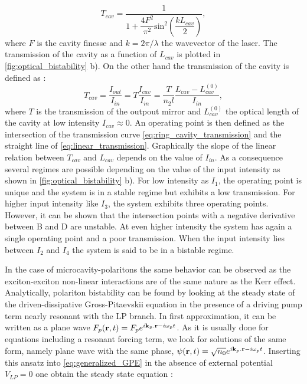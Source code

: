 \begin{equation}
    T_{cav} = \dfrac{1}{1+\dfrac{4F^2}{\pi^2}\mathrm{sin}^2\left(\dfrac{kL_{cav}}{2}\right)},
    \label{eq:ring_cavity_transmission}
\end{equation}
where $F$ is the cavity finesse and $k=2\pi/\lambda$ the wavevector of the laser. The transmission of the cavity as a function of $L_{cav}$ is plotted in \autoref{fig:optical_bistability} b). 
On the other hand the transmission of the cavity is defined as :
\begin{equation}
    T_{cav} = \dfrac{I_{out}}{I_{in}}= T\dfrac{I_{cav}}{I_{in}}= \dfrac{T}{n_2l}\dfrac{L_{cav}-L^{(0)}_{cav}}{I_{in}},
    \label{eq:linear_transmission}
\end{equation}
where $T$ is the transmission of the outpout mirror and $L_{cav}^{(0)}$ the optical length of the cavity at low intensity $I_{cav}\approx 0$. An operating point is then defined as the intersection of the transmission curve \autoref{eq:ring_cavity_transmission} and the straight line of \autoref{eq:linear_transmission}. Graphically the slope 
of the linear relation between $T_{cav}$ and $L_{cav}$ depends on the value of $I_{in}$.
As a consequence several regimes are possible depending on the value of the input intensity as shown in \autoref{fig:optical_bistability} b). For low intensity as $I_1$, the operating point is unique and the system is in a stable regime but exhibits a low transmission. For higher input intensity like $I_3$, the system exhibits three operating points. However, it can be shown that the intersection points with a negative derivative between B and D are unstable. At even higher 
intensity the system has again a single operating point and a poor transmission. When the input intensity lies between $I_2$ and $I_4$ the system is said to be in a bistable regime. 

\bigskip 

In the case of microcavity-polaritons the same behavior can be observed as the exciton-exciton non-linear interactions are of the same nature as the Kerr effect.
Analytically, polariton bistability can be found by looking at the steady state of the driven-dissipative Gross-Pitaevskii equation in the presence of a driving pump term nearly resonant with the LP branch. In first approximation, it can be written as a plane wave $F_p(\mathbf{r},t)=F_p e^{i\mathbf{k}_p.\mathbf{r}-i\omega_p t}$.
As it is usually done for equations including a resonant forcing term, we look for solutions of the same form, namely plane wave with the same phase, $\psi(\mathbf{r},t)= \sqrt{n_0}e^{i\mathbf{k}_p.\mathbf{r}-i\omega_p t}$.
Inserting this ansatz into \autoref{eq:generalized_GPE} in the absence of external potential $V_{LP}=0$ one obtain the steady state equation :

